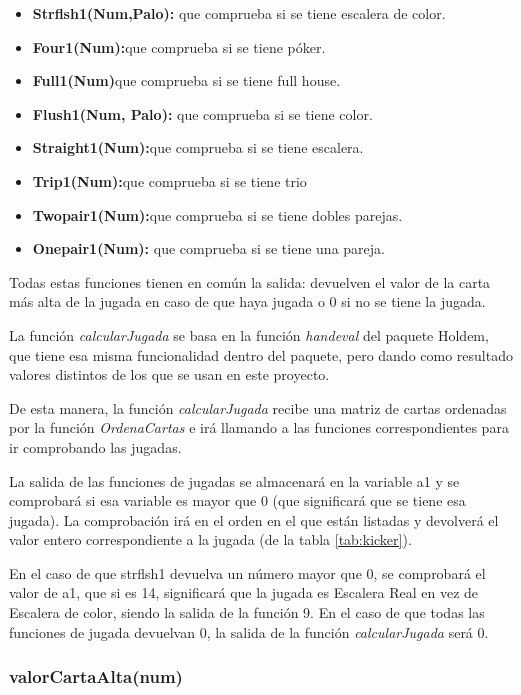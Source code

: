 \begin{itemize}
\item \textbf{Strflsh1(Num,Palo): } que comprueba si se tiene escalera de color. 
\item \textbf{Four1(Num):}que comprueba si se tiene póker.
\item \textbf{Full1(Num)}que comprueba si se tiene full house.
\item \textbf{Flush1(Num, Palo): }que comprueba si se tiene color.
\item \textbf{Straight1(Num):}que comprueba si se tiene escalera.
\item \textbf{Trip1(Num):}que comprueba si se tiene trio
\item \textbf{Twopair1(Num):}que comprueba si se tiene dobles parejas.
\item \textbf{Onepair1(Num):} que comprueba si se tiene una pareja.
\end{itemize}

Todas estas funciones tienen en común la salida: devuelven el valor de la carta más alta de la jugada en caso de que haya jugada o 0 si no se tiene la jugada.

La función \textit{calcularJugada} se basa en la función \textit{handeval} del paquete Holdem, que tiene esa misma funcionalidad dentro del paquete, pero dando como resultado valores distintos de los que se usan en este proyecto. 

De esta manera, la función \textit{calcularJugada} recibe una matriz de cartas ordenadas por la función \textit{OrdenaCartas} e irá llamando a las funciones correspondientes para ir comprobando las jugadas.

La salida de las funciones de jugadas se almacenará en la variable a1 y se comprobará si esa variable es mayor que 0 (que significará que se tiene esa jugada). La comprobación irá en el orden en el que están listadas y devolverá el valor entero correspondiente a la jugada (de la tabla \ref{tab:kicker}). 

En el caso de que strflsh1 devuelva un número mayor que 0, se comprobará el valor de a1, que si es 14, significará que la jugada es Escalera Real en vez de Escalera de color, siendo la salida de la función 9. En el caso de que todas las funciones de jugada devuelvan 0, la salida de la función \textit{calcularJugada} será 0.

\subsubsection{valorCartaAlta(num)}

